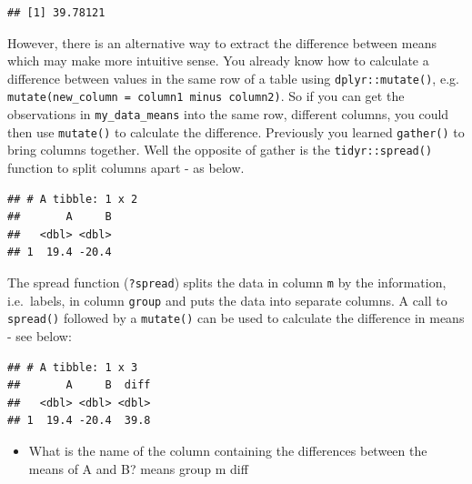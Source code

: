 \documentclass[]{book}
\newenvironment{Shaded}{\begin{snugshade}}{\end{snugshade}}
\newcommand{\DataTypeTok}[1]{\textcolor[rgb]{0.13,0.29,0.53}{#1}}
\newcommand{\KeywordTok}[1]{\textcolor[rgb]{0.13,0.29,0.53}{\textbf{#1}}}
\newcommand{\NormalTok}[1]{#1}
\newcommand{\OperatorTok}[1]{\textcolor[rgb]{0.81,0.36,0.00}{\textbf{#1}}}
\newcommand{\StringTok}[1]{\textcolor[rgb]{0.31,0.60,0.02}{#1}}
\providecommand{\tightlist}{%
  \setlength{\itemsep}{0pt}\setlength{\parskip}{0pt}}
\begin{document}
\begin{verbatim}
## [1] 39.78121
\end{verbatim}

However, there is an alternative way to extract the difference between means which may make more intuitive sense. You already know how to calculate a difference between values in the same row of a table using \texttt{dplyr::mutate()}, e.g. \texttt{mutate(new\_column\ =\ column1\ minus\ column2)}. So if you can get the observations in \texttt{my\_data\_means} into the same row, different columns, you could then use \texttt{mutate()} to calculate the difference. Previously you learned \texttt{gather()} to bring columns together. Well the opposite of gather is the \texttt{tidyr::spread()} function to split columns apart - as below.

\begin{Shaded}
\end{Shaded}

\begin{verbatim}
## # A tibble: 1 x 2
##       A     B
##   <dbl> <dbl>
## 1  19.4 -20.4
\end{verbatim}

The spread function (\texttt{?spread}) splits the data in column \texttt{m} by the information, i.e.~labels, in column \texttt{group} and puts the data into separate columns. A call to \texttt{spread()} followed by a \texttt{mutate()} can be used to calculate the difference in means - see below:

\begin{Shaded}
\end{Shaded}

\begin{verbatim}
## # A tibble: 1 x 3
##       A     B  diff
##   <dbl> <dbl> <dbl>
## 1  19.4 -20.4  39.8
\end{verbatim}

\begin{itemize}
\tightlist
\item
  What is the name of the column containing the differences between the means of A and B? means group m diff
\end{itemize}
\end{document}
